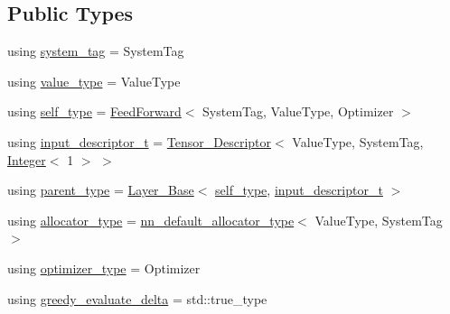 \subsection*{Public Types}
\begin{DoxyCompactItemize}
\item 
using \hyperlink{structbc_1_1nn_1_1FeedForward_ab1ef75eb0a5da610e739f11a29a2cc37}{system\+\_\+tag} = System\+Tag
\item 
using \hyperlink{structbc_1_1nn_1_1FeedForward_ac5c2aca3fbe5dc0274874f302ad027fd}{value\+\_\+type} = Value\+Type
\item 
using \hyperlink{structbc_1_1nn_1_1FeedForward_aed5e64ba066faee4ed589d71a5d8dd56}{self\+\_\+type} = \hyperlink{structbc_1_1nn_1_1FeedForward}{Feed\+Forward}$<$ System\+Tag, Value\+Type, Optimizer $>$
\item 
using \hyperlink{structbc_1_1nn_1_1FeedForward_ab2b920592729859e37b474e4b0356c63}{input\+\_\+descriptor\+\_\+t} = \hyperlink{structbc_1_1nn_1_1Tensor__Descriptor}{Tensor\+\_\+\+Descriptor}$<$ Value\+Type, System\+Tag, \hyperlink{structbc_1_1traits_1_1Integer}{Integer}$<$ 1 $>$ $>$
\item 
using \hyperlink{structbc_1_1nn_1_1FeedForward_add1247c27cdb81aaec0082593d27250d}{parent\+\_\+type} = \hyperlink{structbc_1_1nn_1_1Layer__Base}{Layer\+\_\+\+Base}$<$ \hyperlink{structbc_1_1nn_1_1FeedForward_aed5e64ba066faee4ed589d71a5d8dd56}{self\+\_\+type}, \hyperlink{structbc_1_1nn_1_1FeedForward_ab2b920592729859e37b474e4b0356c63}{input\+\_\+descriptor\+\_\+t} $>$
\item 
using \hyperlink{structbc_1_1nn_1_1FeedForward_abacb25e939f5f9ac89fb49c88dd13043}{allocator\+\_\+type} = \hyperlink{namespacebc_1_1nn_a0025752fc3f47f988b3fae106c825860}{nn\+\_\+default\+\_\+allocator\+\_\+type}$<$ Value\+Type, System\+Tag $>$
\item 
using \hyperlink{structbc_1_1nn_1_1FeedForward_a133dfeb1b5d39d9226c1a45489d71e17}{optimizer\+\_\+type} = Optimizer
\item 
using \hyperlink{structbc_1_1nn_1_1FeedForward_a88c28010efe8e3b192bf94c57d26affe}{greedy\+\_\+evaluate\+\_\+delta} = std\+::true\+\_\+type
\end{DoxyCompactItemize}
